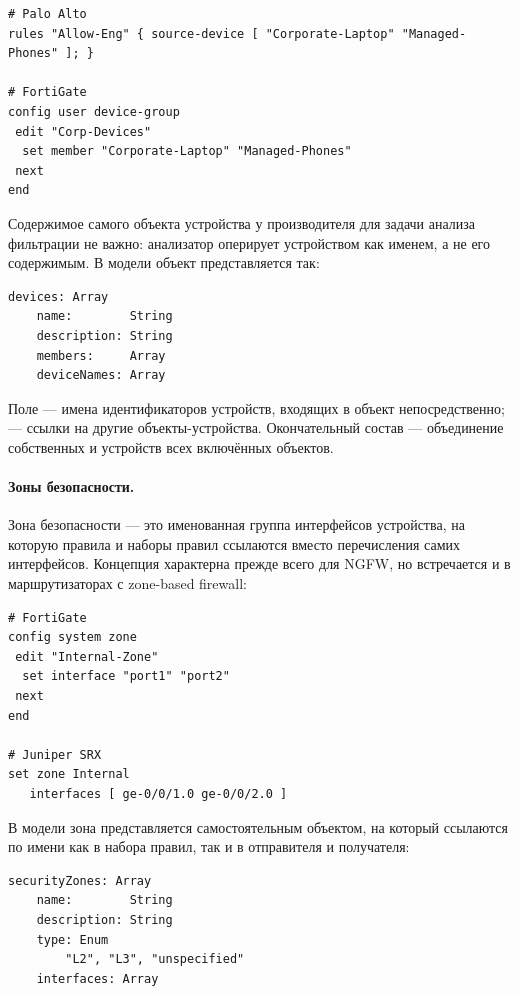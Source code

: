 \begin{verbatim}
# Palo Alto
rules "Allow-Eng" { source-device [ "Corporate-Laptop" "Managed-Phones" ]; }

# FortiGate
config user device-group
 edit "Corp-Devices"
  set member "Corporate-Laptop" "Managed-Phones"
 next
end
\end{verbatim}

Содержимое самого объекта устройства у производителя для задачи анализа фильтрации не важно: анализатор оперирует устройством как именем, а не его содержимым. В модели объект представляется так:

\begin{lstlisting}[style=schemastyle]
devices: Array
    name:        String
    description: String
    members:     Array
    deviceNames: Array
\end{lstlisting}

Поле  --- имена идентификаторов устройств, входящих в объект непосредственно;  --- ссылки на другие объекты-устройства. Окончательный состав --- объединение собственных  и устройств всех включённых объектов.

\paragraph{Зоны безопасности.} Зона безопасности --- это именованная группа интерфейсов устройства, на которую правила и наборы правил ссылаются вместо перечисления самих интерфейсов. Концепция характерна прежде всего для NGFW, но встречается и в маршрутизаторах с zone-based firewall:

\begin{verbatim}
# FortiGate
config system zone
 edit "Internal-Zone"
  set interface "port1" "port2"
 next
end

# Juniper SRX
set zone Internal
   interfaces [ ge-0/0/1.0 ge-0/0/2.0 ]
\end{verbatim}

В модели зона представляется самостоятельным объектом, на который ссылаются по имени  как в  набора правил, так и в  отправителя и получателя:

\begin{lstlisting}[style=schemastyle]
securityZones: Array
    name:        String
    description: String
    type: Enum
        "L2", "L3", "unspecified"
    interfaces: Array
\end{lstlisting}

